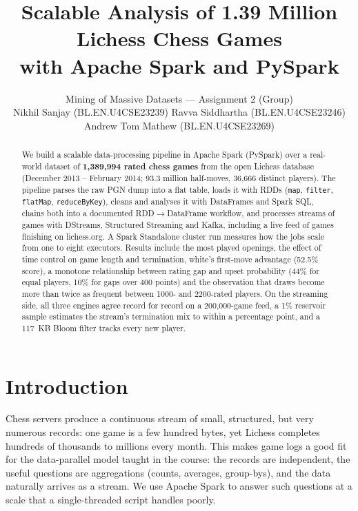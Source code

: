 \documentclass[11pt,a4paper]{article}
\title{\textbf{Scalable Analysis of 1.39 Million Lichess Chess Games\\with Apache Spark and PySpark}}
\author{Mining of Massive Datasets --- Assignment 2 (Group)\\[2pt]
\small Nikhil Sanjay (BL.EN.U4CSE23239) \quad Ravva Siddhartha (BL.EN.U4CSE23246) \quad Andrew Tom Mathew (BL.EN.U4CSE23269)}
\date{}
\begin{document}
\maketitle

\begin{abstract}
We build a scalable data-processing pipeline in Apache Spark (PySpark) over a real-world
dataset of \textbf{1,389,994 rated chess games} from the open Lichess database
(December 2013 -- February 2014; 93.3 million half-moves, 36,666 distinct players).
The pipeline parses the raw PGN dump into a flat table, loads it with RDDs
(\texttt{map}, \texttt{filter}, \texttt{flatMap}, \texttt{reduceByKey}), cleans and
analyses it with DataFrames and Spark SQL, chains both into a documented
RDD$\rightarrow$DataFrame workflow, and processes streams of games with DStreams,
Structured Streaming and Kafka, including a live feed of games finishing on lichess.org.
A Spark Standalone cluster run measures how the jobs scale from one to eight executors. Results include the most played openings,
the effect of time control on game length and termination, white's first-move advantage
(52.5\% score), a monotone relationship between rating gap and upset probability
(44\% for equal players, 10\% for gaps over 400 points) and the observation that draws
become more than twice as frequent between 1000- and 2200-rated players. On the
streaming side, all three engines agree record for record on a 200,000-game feed, a 1\%
reservoir sample estimates the stream's termination mix to within a percentage point, and a
117~KB Bloom filter tracks every new player.
\end{abstract}

\section{Introduction}
Chess servers produce a continuous stream of small, structured, but very numerous
records: one game is a few hundred bytes, yet Lichess completes hundreds of thousands to millions every month.
This makes game logs a good fit for the data-parallel model taught in the course:
the records are independent, the useful questions are aggregations (counts, averages,
group-bys), and the data naturally arrives as a stream. We use Apache Spark to answer
such questions at a scale that a single-threaded script handles poorly.
\end{document}

